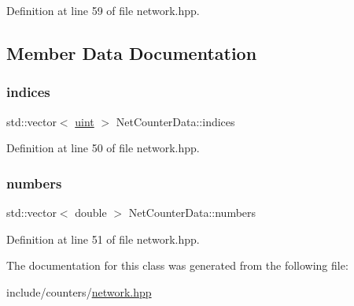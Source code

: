 Definition at line 59 of file network.\+hpp.



\subsection{Member Data Documentation}
\mbox{\label{class_net_counter_data_ae2f47af99f3fa785d3faac089ab90d83}} 
\subsubsection{\texorpdfstring{indices}{indices}}
{\footnotesize\ttfamily std\+::vector$<$ \hyperlink{typedefs_8hpp_a91ad9478d81a7aaf2593e8d9c3d06a14}{uint} $>$ Net\+Counter\+Data\+::indices}



Definition at line 50 of file network.\+hpp.

\mbox{\label{class_net_counter_data_ad218e01cd14fb4abfbe21d8d92a6cbd3}} 
\subsubsection{\texorpdfstring{numbers}{numbers}}
{\footnotesize\ttfamily std\+::vector$<$ double $>$ Net\+Counter\+Data\+::numbers}



Definition at line 51 of file network.\+hpp.



The documentation for this class was generated from the following file\+:\begin{DoxyCompactItemize}
\item 
include/counters/\hyperlink{network_8hpp}{network.\+hpp}\end{DoxyCompactItemize}
